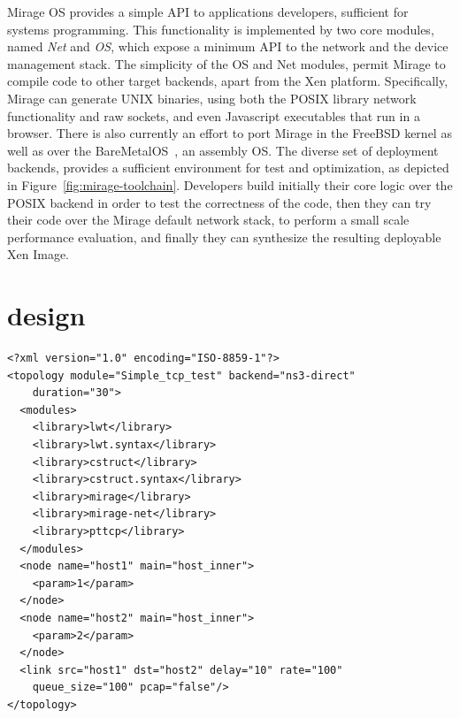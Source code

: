 Mirage OS provides a simple API to applications developers, sufficient for
systems programming. This functionality is implemented by two core modules,
named \textit{Net} and \textit{OS}, which expose a minimum API to the network
and the device management stack.  The simplicity of the OS and Net modules,
permit Mirage to compile code to other target backends, apart from the Xen
platform. Specifically, Mirage can generate UNIX binaries, using both the POSIX
library network functionality and raw sockets, and even Javascript executables
that run in a browser. There is also currently an effort to port Mirage in the
FreeBSD kernel as well as over the BareMetalOS~\cite{baremetalOS}, an assembly OS.
The diverse set of deployment backends, provides  a sufficient environment for
test and optimization, as depicted in Figure~\ref{fig:mirage-toolchain}.
Developers build initially their core logic over the POSIX backend in order to
test the correctness of the code, then they can try their code over the Mirage
default network stack, to perform a small scale performance evaluation, and
finally they can synthesize the resulting deployable Xen Image.


\section{\sdnsim design} \label{sec:sdnsim-design}

\lstset{language=XML,
numberstyle=\footnotesize,
basicstyle=\ttfamily\footnotesize,
captionpos=b,
}
\begin{lstlisting}[caption={A sample \sdnsim configuration file interconnecting
  a server and a client host},label={lst:sdnsim-conf}]
<?xml version="1.0" encoding="ISO-8859-1"?>
<topology module="Simple_tcp_test" backend="ns3-direct" 
    duration="30">
  <modules>
    <library>lwt</library>
    <library>lwt.syntax</library>
    <library>cstruct</library>
    <library>cstruct.syntax</library>
    <library>mirage</library>
    <library>mirage-net</library>
    <library>pttcp</library>
  </modules>
  <node name="host1" main="host_inner"> 
    <param>1</param>
  </node>
  <node name="host2" main="host_inner"> 
    <param>2</param>
  </node>
  <link src="host1" dst="host2" delay="10" rate="100" 
    queue_size="100" pcap="false"/>
</topology>
\end{lstlisting}

